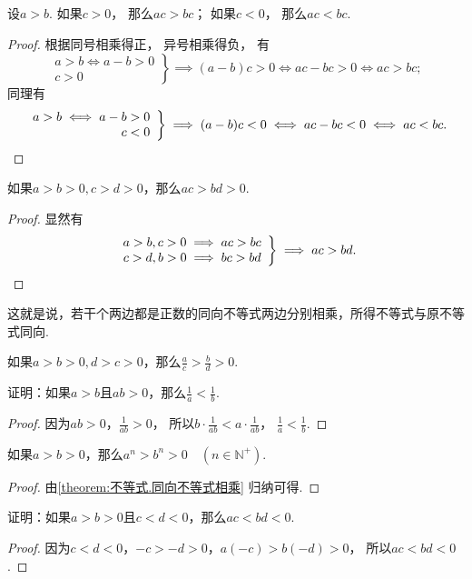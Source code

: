 \begin{theorem}
设\(a>b\).
如果\(c>0\)，
那么\(ac>bc\)；
如果\(c<0\)，
那么\(ac<bc\).
\begin{proof}
根据同号相乘得正，
异号相乘得负，
有\[
	\left. \begin{array}{r}
		a>b \iff a-b>0 \\
		c>0
	\end{array} \right\}
	\implies (a-b)c>0
	\iff ac-bc>0
	\iff ac>bc;
\]
同理有\[
	\left. \begin{array}{r}
		a>b \iff a-b> 0 \\
		c<0
	\end{array} \right\}
	\implies (a-b)c<0
	\iff ac-bc<0
	\iff ac<bc.
	\qedhere
\]
\end{proof}
\end{theorem}

\begin{corollary}\label{theorem:不等式.同向不等式相乘}
如果\(a>b>0,c>d>0\)，那么\(ac>bd>0\).
\begin{proof}
显然有\[
	\left. \begin{array}{r}
		a>b,c>0 \implies ac>bc \\
		c>d,b>0 \implies bc>bd
	\end{array} \right\}
	\implies ac>bd.
	\qedhere
\]
\end{proof}
\end{corollary}
这就是说，若干个两边都是正数的同向不等式两边分别相乘，所得不等式与原不等式同向.

\begin{corollary}
如果\(a>b>0,d>c>0\)，那么\(\frac{a}{c}>\frac{b}{d}>0\).
\end{corollary}

\begin{example}
证明：如果\(a > b\)且\(ab > 0\)，那么\(\frac1a < \frac1b\).
\begin{proof}
因为\(ab > 0\)，\(\frac1{ab} > 0\)，
所以\(b \cdot \frac1{ab} < a \cdot \frac1{ab}\)，
\(\frac1a < \frac1b\).
\end{proof}
\end{example}

\begin{corollary}
如果\(a>b>0\)，那么\(a^n>b^n>0 \quad (n\in\mathbb{N}^+)\).
\begin{proof}
由\cref{theorem:不等式.同向不等式相乘} 归纳可得.
\end{proof}
\end{corollary}

\begin{example}
证明：如果\(a > b > 0\)且\(c < d < 0\)，那么\(ac < bd < 0\).
\begin{proof}
因为\(c < d < 0\)，\(-c > -d > 0\)，\(a(-c) > b(-d) > 0\)，
所以\(ac < bd < 0\).
\end{proof}
\end{example}

